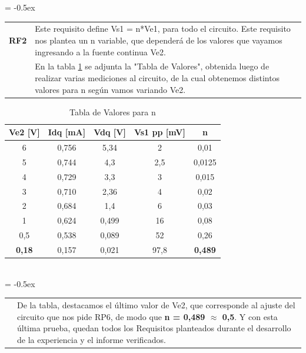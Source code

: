 \centering
\extrarowheight = -0.5ex
\renewcommand{\arraystretch}{2.25}
\begin{tabular}{p{} p{}}
\textbf{RF2} & Este requisito define Vs1 = n*Ve1, para todo el circuito. Este requisito nos plantea un n variable, que dependerá de los valores que vayamos ingresando a la fuente continua Ve2.\\

& En la tabla \ref{Table2} se adjunta la "Tabla de Valores", obtenida luego de realizar varias mediciones al circuito, de la cual obtenemos distintos valores para n según vamos variando Ve2.
\end{tabular}

\begin{table}[h]
\centering
\caption{Tabla de Valores para n}
\label{Table2}
\begin{tabular}{@{}|c|c|c|c|c|@{}}
\toprule
Ve2 {[}V{]} & Idq {[}mA{]} & Vdq {[}V{]} & Vs1 pp {[}mV{]} & n \\ \midrule
6 & 0,756 & 5,34 & 2 & 0,01 \\
5 & 0,744 & 4,3 & 2,5 & 0,0125 \\
4 & 0,729 & 3,3 & 3 & 0,015 \\
3 & 0,710 & 2,36 & 4 & 0,02 \\
2 & 0,684 & 1,4 & 6 & 0,03 \\
1 & 0,624 & 0,499 & 16 & 0,08 \\
0,5 & 0,538 & 0,089 & 52 & 0,26 \\ \midrule
\textbf{0,18} & 0,157 & 0,021 & 97,8 & \textbf{0,489} \\ \bottomrule
\end{tabular}
\end{table}
\\ 

\centering
\extrarowheight = -0.5ex
\renewcommand{\arraystretch}{2.25}
\begin{tabular}{p{} p{}}
& De la tabla, destacamos el último valor de Ve2, que corresponde al ajuste del circuito que nos pide RP6, de modo que \textbf{ n = 0,489 $\approx$ 0,5}. Y con esta última prueba, quedan todos los Requisitos planteados durante el desarrollo de la experiencia y el informe verificados. \\
\end{tabular}
\\
\\
\\
\newpage

 